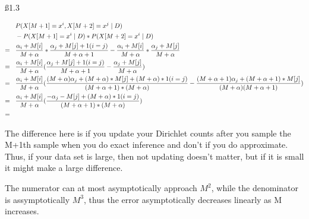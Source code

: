 \ss{1.3}

\begin{align*}
& P(X[M+1] = x^i, X[M+2] = x^j \mid D) \\ & - P(X[M+1] = x^i \mid D) * P(X[M+2] = x^i \mid  D) \\ = \hspace{3 mm} &
\frac{\alpha_i + M[i]}{M + \alpha} * \frac{\alpha_j + M[j] + 1(i=j)}{M + \alpha + 1} - \frac{\alpha_i + M[i]}{M + \alpha} * \frac{\alpha_j + M[j]}{M + \alpha} \\ = \hspace{3 mm} &
\frac{\alpha_i + M[i]}{M + \alpha} (\frac{\alpha_j + M[j] + 1(i=j)}{M + \alpha + 1} - \frac{\alpha_j + M[j]}{M + \alpha}) \\ = \hspace{3 mm} &
\frac{\alpha_i + M[i]}{M + \alpha} (\frac{(M+\alpha) \alpha_j + (M+\alpha)*M[j] + (M+\alpha)*1(i=j)}{(M + \alpha + 1)*(M+\alpha)} - \frac{(M + \alpha + 1)\alpha_j + (M + \alpha + 1)*M[j]}{(M + \alpha)(M + \alpha + 1)}) \\ = \hspace{3 mm} &
\frac{\alpha_i + M[i]}{M + \alpha} (\frac{  -\alpha_j - M[j] + (M+\alpha)*1(i=j)}{(M + \alpha + 1)*(M+\alpha)}) \\ = \hspace{3 mm} &
\end{align*}

The difference here is if you update your Dirichlet counts after you sample the M+1th sample when you do exact inference and don't if you do approximate. Thus, if your data set is large, then not updating doesn't matter, but if it is small it might make a large difference.

The numerator can at most asymptotically approach $M^2$, while the denominator is assymptotically $M^3$, thus the error asymptotically decreases linearly as M increases.

